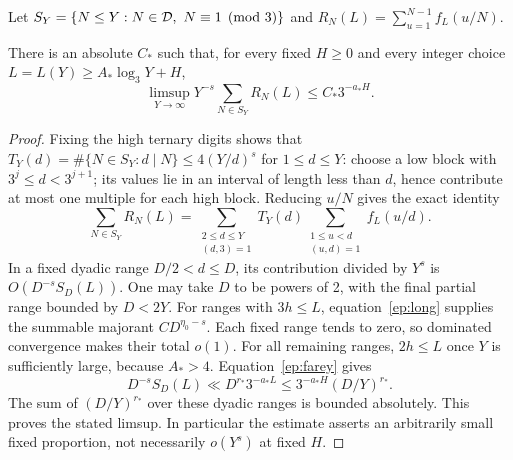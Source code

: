 Let $S_Y=\{N\le Y:N\in\D,\ N\equiv1\pmod3\}$ and
$R_N(L)=\sum_{u=1}^{N-1}f_L(u/N)$.
\begin{lemma}\label{ep:mean}
There is an absolute $C_*$ such that, for every fixed $H\ge0$ and
every integer choice $L=L(Y)\ge A_*\log_3Y+H$,
\[
 \limsup_{Y\to\infty}Y^{-s}\sum_{N\in S_Y}R_N(L)
 \le C_*3^{-a_*H}.
\]
\end{lemma}
\begin{proof}
Fixing the high ternary digits shows that
$T_Y(d)=\#\{N\in S_Y:d\mid N\}\le4(Y/d)^s$ for $1\le d\le Y$:
choose a low block with $3^j\le d<3^{j+1}$; its values lie in an
interval of length less than $d$, hence contribute at most one multiple
for each high block. Reducing $u/N$ gives the exact identity
\[
 \sum_{N\in S_Y}R_N(L)=
 \sum_{\substack{2\le d\le Y\\(d,3)=1}}T_Y(d)
       \sum_{\substack{1\le u<d\\(u,d)=1}}f_L(u/d).
\]
In a fixed dyadic range $D/2<d\le D$, its contribution divided by
$Y^s$ is $O(D^{-s}S_D(L))$. One may take $D$ to be powers of 2,
with the final partial range bounded by $D<2Y$.
For ranges with $3h\le L$, equation~\eqref{ep:long} supplies the
summable majorant $CD^{\eta_0-s}$. Each fixed range tends to zero,
so dominated convergence makes their total $o(1)$.
For all remaining ranges, $2h\le L$ once $Y$ is sufficiently large,
because $A_*>4$. Equation~\eqref{ep:farey} gives
\[
 D^{-s}S_D(L)\ll D^{r_*}3^{-a_*L}
 \le 3^{-a_*H}(D/Y)^{r_*}.
\]
The sum of $(D/Y)^{r_*}$ over these dyadic ranges is bounded absolutely.
This proves the stated limsup. In particular the estimate asserts an
arbitrarily small fixed proportion, not necessarily $o(Y^s)$ at fixed $H$.
\end{proof}


